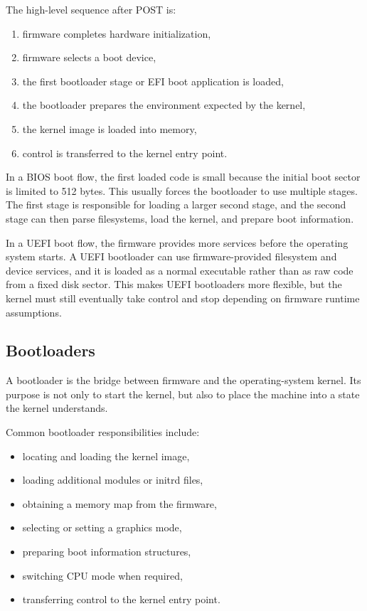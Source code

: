The high-level sequence after POST is:
\begin{enumerate}
  \item firmware completes hardware initialization,
  \item firmware selects a boot device,
  \item the first bootloader stage or EFI boot application is loaded,
  \item the bootloader prepares the environment expected by the kernel,
  \item the kernel image is loaded into memory,
  \item control is transferred to the kernel entry point.
\end{enumerate}

In a BIOS boot flow, the first loaded code is small because the initial boot sector is limited to 512 bytes. This usually forces the bootloader to use multiple stages. The first stage is responsible for loading a larger second stage, and the second stage can then parse filesystems, load the kernel, and prepare boot information.

In a UEFI boot flow, the firmware provides more services before the operating system starts. A UEFI bootloader can use firmware-provided filesystem and device services, and it is loaded as a normal executable rather than as raw code from a fixed disk sector. This makes UEFI bootloaders more flexible, but the kernel must still eventually take control and stop depending on firmware runtime assumptions.

\subsection{Bootloaders}
A bootloader is the bridge between firmware and the operating-system kernel. Its purpose is not only to start the kernel, but also to place the machine into a state the kernel understands.

Common bootloader responsibilities include:
\begin{itemize}
  \item locating and loading the kernel image,
  \item loading additional modules or initrd files,
  \item obtaining a memory map from the firmware,
  \item selecting or setting a graphics mode,
  \item preparing boot information structures,
  \item switching CPU mode when required,
  \item transferring control to the kernel entry point.
\end{itemize}

